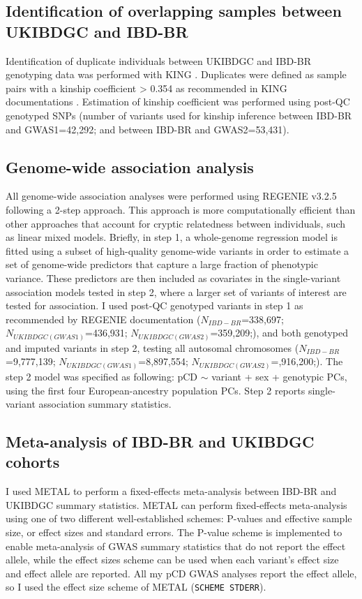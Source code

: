 \subsection{Identification of overlapping samples between UKIBDGC and IBD-BR}
Identification of duplicate individuals between UKIBDGC and IBD-BR genotyping data was performed with KING \cite{king-software}. Duplicates were defined as sample pairs with a kinship coefficient > 0.354 as recommended in KING documentations \cite{king-software}. Estimation of kinship coefficient was performed using post-QC genotyped SNPs (number of variants used for kinship inference between IBD-BR and GWAS1=42,292; and between IBD-BR and GWAS2=53,431).

\subsection{Genome-wide association analysis} \label{sec:gwas_methods}
All genome-wide association analyses were performed using REGENIE v3.2.5 \cite{Mbatchou2021-qm} following a 2-step approach. This approach is more computationally efficient than other approaches that account for cryptic relatedness between individuals, such as linear mixed models. Briefly, in step 1, a whole-genome regression model is fitted using a subset of high-quality genome-wide variants in order to estimate a set of genome-wide predictors that capture a large fraction of phenotypic variance. These predictors are then included as covariates in the single-variant association models tested in step 2, where a larger set of variants of interest are tested for association. I used post-QC genotyped variants in step 1 as recommended by REGENIE documentation ($N_{IBD-BR}$=338,697; $N_{UKIBDGC(GWAS1)}$=436,931; $N_{UKIBDGC(GWAS2)}$=359,209;), and both genotyped and imputed variants in step 2, testing all autosomal chromosomes ($N_{IBD-BR}$=9,777,139; $N_{UKIBDGC(GWAS1)}$=8,897,554; $N_{UKIBDGC(GWAS2)}$=,916,200;). The step 2 model was specified as following: pCD $\sim$ variant + sex + genotypic PCs, using the first four European-ancestry population PCs. Step 2 reports single-variant association summary statistics. 

\subsection{Meta-analysis of IBD-BR and UKIBDGC cohorts}
I used METAL to perform a fixed-effects meta-analysis between IBD-BR and UKIBDGC summary statistics.  METAL can perform fixed-effects meta-analysis using one of two different well-established schemes: P-values and effective sample size, or effect sizes and standard errors. The P-value scheme is implemented to enable meta-analysis of GWAS summary statistics that do not report the effect allele, while the effect sizes scheme can be used when each variant's effect size and effect allele are reported. All my pCD GWAS analyses report the effect allele, so I used the effect size scheme of METAL (\Verb+SCHEME STDERR+). \\

